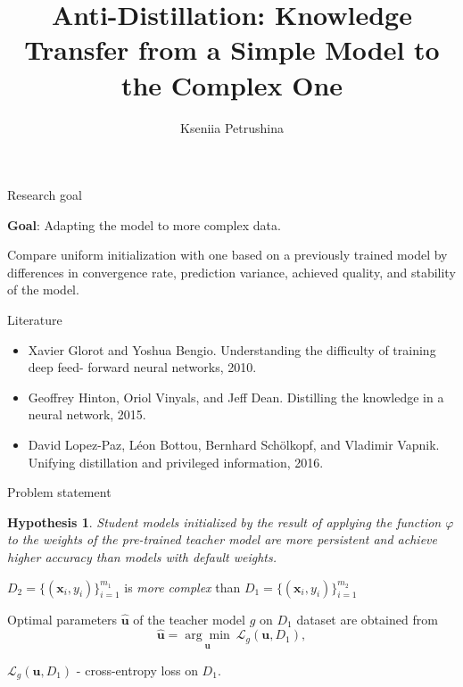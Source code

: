 \documentclass[dvipsnames]{beamer}
\title[\hbox to 56mm{Theme}]{Anti-Distillation: Knowledge Transfer from a Simple Model to the Complex One}
\author[K.~Petrushina]{Kseniia Petrushina}
\institute{Moscow~Institute~of~Physics~and~Technology}
\date{\footnotesize
\par\smallskip\emph{Expert:} Vadim~Strijov
\par\smallskip\emph{Consultant:} Andrey Grabovoy
\par\bigskip\small 2022}
\begin{document}
\begin{frame}
\thispagestyle{empty}
\maketitle
\end{frame}

\begin{frame}{Research goal}

    \textbf{Goal}: Adapting the model to more complex data.
    
    \bigskip
    
    Compare uniform initialization with one based on a previously trained model by differences in convergence rate, prediction variance, achieved quality, and stability of the model.

\end{frame}


\begin{frame}{Literature}
    \begin{itemize}
        \item Xavier Glorot and Yoshua Bengio. Understanding the difficulty of training deep feed- forward neural networks, 2010.
        \item Geoffrey Hinton, Oriol Vinyals, and Jeff Dean. Distilling the knowledge in a neural network, 2015.
        \item David Lopez-Paz, Léon Bottou, Bernhard Schölkopf, and Vladimir Vapnik. Unifying distillation and privileged information, 2016.
    \end{itemize}
\end{frame}


\begin{frame}{Problem statement}
    \newtheorem{hypothesis}{Hypothesis}
    \begin{hypothesis}
    Student models initialized by the result of applying the function $\varphi$ to the weights of the pre-trained teacher model are more persistent and achieve higher accuracy than models with default weights.
    \end{hypothesis}
    
    \bigskip
    
    $D_2 = \{(\textbf{x}_i, y_i)\}_{i=1}^{m_1}$ is \textit{more complex} than $D_1 = \{(\textbf{x}_i, y_i)\}_{i=1}^{m_2}$
    
    \bigskip
    
    Optimal parameters $\hat{\textbf{u}}$ of the teacher model $g$ on $D_1$ dataset are obtained from 
    $$\hat{\mathbf{u}} =  \underset{\mathbf{u}}{\arg\min}~\mathcal{L}_g(\mathbf{u}, D_1),$$
    
    $\mathcal{L}_g(\mathbf{u}, D_1)$ - cross-entropy loss on $D_1$.

\end{frame}
\end{document}
